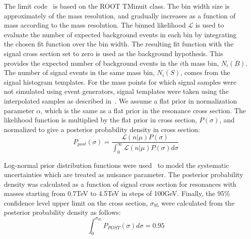 The limit code~\cite{Web:Limit} is based on the ROOT TMinuit class. The bin width size is approximately of the \gamjet mass resolution, and gradually
increases as a function of mass according to the \gamjet mass resolution. The binned likelihood $\mathcal{L}$ is used to evaluate the number 
of expected background events in each bin by integrating the chosen fit function over the bin width. The resulting fit function with the signal 
cross section set to zero is used as the background hypothesis. This provides the expected number of background events in the $i$th \gamjet mass bin, 
$N_{i}(B)$. The number of signal events in the same mass bin, $N_{i}(S)$, comes from the signal histogram templates. For the mass points for which 
\qstar signal samples were not simulated using event generators, signal templates were taken using the interpolated samples as described 
in~\sectn{\ref{Se:InterpolationTech}}. We assume a flat prior in normalization parameter $\alpha$, which is the same as a flat prior in the 
resonance cross section. The likelihood function is multiplied by the flat prior in cross section, $P(\sigma)$, and normalized to give a posterior 
probability density in cross section:
\begin{equation}
P_{post}(\sigma) = \frac{\mathcal{L}(n|\mu)P(\sigma)}{\int_{0}^{\infty}\mathcal{L}(n|\mu)P(\sigma)d\sigma}
\end{equation}

Log-normal prior distribution functions were used~\cite{Web:stat} to model the systematic uncertainties which are treated as nuisance parameter. 
The posterior probability density was calculated as a function of signal cross section for resonances with masses starting from 0.7\unit{TeV} 
to 4.5\unit{TeV} in steps of 100\unit{GeV}. Finally, the 95\% confidence level upper limit on the cross section, $\sigma_{95}$ were calculated 
from the posterior probability density as follows:
\begin{equation}
\int_{0}^{\sigma_{95}}P_{POST}(\sigma)d\sigma = 0.95
\end{equation}

